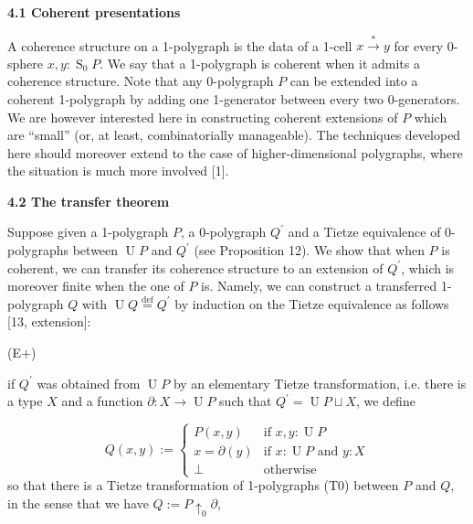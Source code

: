 \documentclass[10pt,a4paper]{amsart}
\begin{document}
 
 
\par\medskip\noindent\textbf{4.1 Coherent presentations}\par
 
 
A coherence structure on a 1-polygraph is the data of a 1-cell $x\overset{*}{\to}y$ for every 0-sphere $x,y:\operatorname{S}_{0}P$. We say that a 1-polygraph is coherent when it admits a coherence structure. Note that any 0-polygraph $P$ can be extended into a coherent 1-polygraph by adding one 1-generator between every two 0-generators. We are however interested here in constructing coherent extensions of $P$ which are “small” (or, at least, combinatorially manageable). The techniques developed here should moreover extend to the case of higher-dimensional polygraphs, where the situation is much more involved [1].\par
 
 
 
 
\par\medskip\noindent\textbf{4.2 The transfer theorem}\par
 
 
Suppose given a 1-polygraph $P$, a 0-polygraph $Q^{\prime}$ and a Tietze equivalence of 0-polygraphs between $\operatorname{U}P$ and $Q^{\prime}$ (see Proposition 12). We show that when $P$ is coherent, we can transfer its coherence structure to an extension of $Q^{\prime}$, which is moreover finite when the one of $P$ is. Namely, we can construct a transferred 1-polygraph $Q$ with $\operatorname{U}Q\overset{\text{def}}{=}Q^{\prime}$ by induction on the Tietze equivalence as follows [13, extension]:\par
  (E$+$)  
 
if $Q^{\prime}$ was obtained from $\operatorname{U}P$ by an elementary Tietze transformation, i.e. there is a type $X$ and a function $\partial:X\to\operatorname{U}P$ such that $Q^{\prime}=\operatorname{U}P\sqcup X$, we define\par
    \[Q(x,y):=\begin{cases}P(x,y)&\text{if $x,y:\operatorname{U}P$}\\
x=\partial(y)&\text{if $x:\operatorname{U}P$ and $y:X$}\\
\bot&\text{otherwise}\end{cases}\]    
so that there is a Tietze transformation of 1-polygraphs (T0) between $P$ and $Q$, in the sense that we have $Q:=P{\uparrow_{0}}\partial$,\par
 
\end{document}
